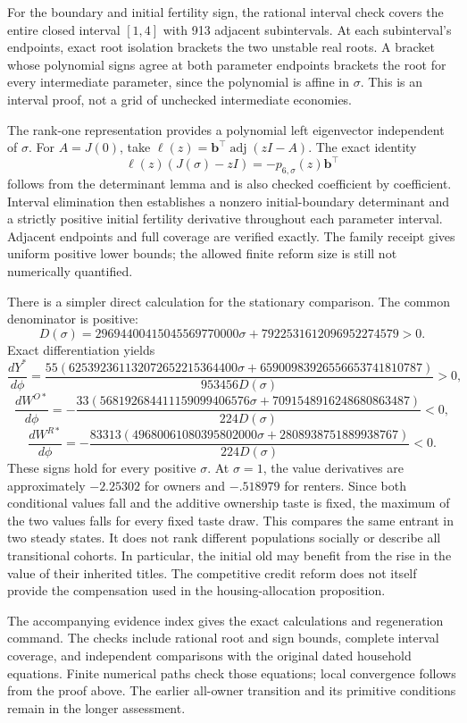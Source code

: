 \documentclass[
  11pt,
]{article}
\begin{document}
For the boundary and initial fertility sign, the rational interval check
covers the entire closed interval \([1,4]\) with 913 adjacent
subintervals. At each subinterval's endpoints, exact root isolation
brackets the two unstable real roots. A bracket whose polynomial signs
agree at both parameter endpoints brackets the root for every
intermediate parameter, since the polynomial is affine in \(\sigma\).
This is an interval proof, not a grid of unchecked intermediate
economies.

The rank-one representation provides a polynomial left eigenvector
independent of \(\sigma\). For \(A=J(0)\), take
\(\ell(z)=\mathbf b^\top\operatorname{adj}(zI-A)\). The exact identity
\[
 \ell(z)(J(\sigma)-zI)=-p_{6,\sigma}(z)\mathbf b^\top
\] follows from the determinant lemma and is also checked coefficient by
coefficient. Interval elimination then establishes a nonzero
initial-boundary determinant and a strictly positive initial fertility
derivative throughout each parameter interval. Adjacent endpoints and
full coverage are verified exactly. The family receipt gives uniform
positive lower bounds; the allowed finite reform size is still not
numerically quantified.

There is a simpler direct calculation for the stationary comparison. The
common denominator is positive: \[
D(\sigma)=29694400415045569770000\sigma+7922531612096952274579>0.
\] Exact differentiation yields \[
 \frac{dY^*}{d\phi}=
 \frac{55(625392361132072652215364400\sigma+
                 65900983926556653741810787)}{953456D(\sigma)}>0,
\] \[
 \frac{dW^{O*}}{d\phi}=
 -\frac{33(568192684411159099406576\sigma+
                 7091548916248680863487)}{224D(\sigma)}<0,
\] \[
 \frac{dW^{R*}}{d\phi}=
 -\frac{83313(49680061080395802000\sigma+
                 2808938751889938767)}{224D(\sigma)}<0.
\] These signs hold for every positive \(\sigma\). At \(\sigma=1\), the
value derivatives are approximately \(-2.25302\) for owners and
\(-.518979\) for renters. Since both conditional values fall and the
additive ownership taste is fixed, the maximum of the two values falls
for every fixed taste draw. This compares the same entrant in two steady
states. It does not rank different populations socially or describe all
transitional cohorts. In particular, the initial old may benefit from
the rise in the value of their inherited titles. The competitive credit
reform does not itself provide the compensation used in the
housing-allocation proposition.

The accompanying evidence index gives the exact calculations and
regeneration command. The checks include rational root and sign bounds,
complete interval coverage, and independent comparisons with the
original dated household equations. Finite numerical paths check those
equations; local convergence follows from the proof above. The earlier
all-owner transition and its primitive conditions remain in the longer
assessment.
\end{document}
